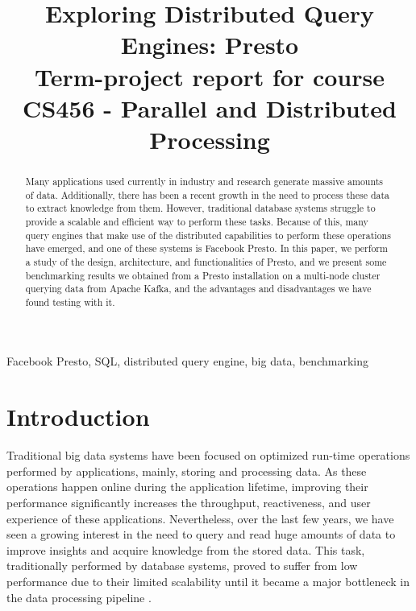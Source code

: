 \documentclass[conference]{IEEEtran}
\begin{document}
\title{Exploring Distributed Query Engines: Presto\\
{\footnotesize Term-project report for course CS456 - Parallel and Distributed Processing}
}

\author{
\and
{}
}

\maketitle
\thispagestyle{plain}
\pagestyle{plain}

\begin{abstract}
Many applications used currently in industry and research generate massive amounts of data. Additionally, there has been a recent growth in the need to process these data to extract knowledge from them. However, traditional database systems struggle to provide a scalable and efficient way to perform these tasks. Because of this, many query engines that make use of the distributed capabilities to perform these operations have emerged, and one of these systems is Facebook Presto. In this paper, we perform a study of the design, architecture, and functionalities of Presto, and we present some benchmarking results we obtained from a Presto installation on a multi-node cluster querying data from Apache Kafka, and the advantages and disadvantages we have found testing with it.
\end{abstract}

\begin{IEEEkeywords}
Facebook Presto, SQL, distributed query engine, big data, benchmarking
\end{IEEEkeywords}

\section{Introduction}
Traditional big data systems have been focused on optimized run-time operations performed by applications, mainly, storing and processing data. As these operations happen online during the application lifetime, improving their performance significantly increases the throughput, reactiveness, and user experience of these applications. Nevertheless, over the last few years, we have seen a growing interest in the need to query and read huge amounts of data to improve insights and acquire knowledge from the stored data. This task, traditionally performed by database systems, proved to suffer from low performance due to their limited scalability until it became a major bottleneck in the data processing pipeline \cite{pokorny-2011}.
\end{document}
